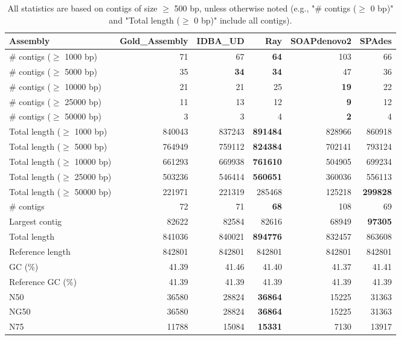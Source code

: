 \documentclass[12pt,a4paper]{article}
\begin{document}
\begin{table}[ht]
\begin{center}
\caption{All statistics are based on contigs of size $\geq$ 500 bp, unless otherwise noted (e.g., "\# contigs ($\geq$ 0 bp)" and "Total length ($\geq$ 0 bp)" include all contigs).}
\begin{tabular}{|l*{5}{|r}|}
\hline
Assembly & Gold\_Assembly & IDBA\_UD & Ray & SOAPdenovo2 & SPAdes \\ \hline
\# contigs ($\geq$ 1000 bp) & 71 & 67 & {\bf 64} & 103 & 66 \\ \hline
\# contigs ($\geq$ 5000 bp) & 35 & {\bf 34} & {\bf 34} & 47 & 36 \\ \hline
\# contigs ($\geq$ 10000 bp) & 21 & 21 & 25 & {\bf 19} & 22 \\ \hline
\# contigs ($\geq$ 25000 bp) & 11 & 13 & 12 & {\bf 9} & 12 \\ \hline
\# contigs ($\geq$ 50000 bp) & 3 & 3 & 4 & {\bf 2} & 4 \\ \hline
Total length ($\geq$ 1000 bp) & 840043 & 837243 & {\bf 891484} & 828966 & 860918 \\ \hline
Total length ($\geq$ 5000 bp) & 764949 & 759112 & {\bf 824384} & 702141 & 793124 \\ \hline
Total length ($\geq$ 10000 bp) & 661293 & 669938 & {\bf 761610} & 504905 & 699234 \\ \hline
Total length ($\geq$ 25000 bp) & 503236 & 546414 & {\bf 560651} & 360036 & 556113 \\ \hline
Total length ($\geq$ 50000 bp) & 221971 & 221319 & 285468 & 125218 & {\bf 299828} \\ \hline
\# contigs & 72 & 71 & {\bf 68} & 108 & 69 \\ \hline
Largest contig & 82622 & 82584 & 82616 & 68949 & {\bf 97305} \\ \hline
Total length & 841036 & 840021 & {\bf 894776} & 832457 & 863608 \\ \hline
Reference length & 842801 & 842801 & 842801 & 842801 & 842801 \\ \hline
GC (\%) & 41.39 & 41.46 & 41.40 & 41.37 & 41.41 \\ \hline
Reference GC (\%) & 41.39 & 41.39 & 41.39 & 41.39 & 41.39 \\ \hline
N50 & 36580 & 28824 & {\bf 36864} & 15225 & 31363 \\ \hline
NG50 & 36580 & 28824 & {\bf 36864} & 15225 & 31363 \\ \hline
N75 & 11788 & 15084 & {\bf 15331} & 7130 & 13917 \\ \hline

\end{tabular}
\end{center}
\end{table}
\end{document}
